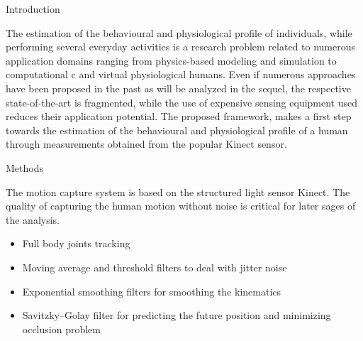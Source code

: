 \documentclass[final]{beamer}
\newlength{\onecolwid}
\begin{document}
\begin{frame}[t]
\begin{columns}[t]
\begin{column}{\onecolwid}
\begin{block}{Introduction}

The estimation of the behavioural and physiological profile of individuals, while performing several everyday activities is a research problem related to numerous application domains ranging from physics-based modeling and simulation to computational c and virtual physiological humans. Even if numerous approaches have been proposed in the past as will be analyzed in the sequel, the respective state-of-the-art is fragmented, while the use of expensive sensing equipment used reduces their application potential. The proposed framework, makes a first step towards the estimation of the behavioural and physiological profile of a human through measurements obtained from the popular Kinect sensor.

\end{block}


\begin{block}{Methods}
	
	The motion capture system is based on the structured light sensor Kinect. The quality of capturing the human motion without noise is critical for later sages of the analysis.
	
	\begin{itemize}
		\item Full body joints tracking
		\item Moving average and threshold filters to deal with jitter noise
		\item Exponential smoothing filters for smoothing the kinematics
		\item Savitzky--Golay filter for predicting the future position and minimizing occlusion problem
	\end{itemize}

\end{block}

\end{column} %




\end{columns}
\end{frame}
\end{document}
